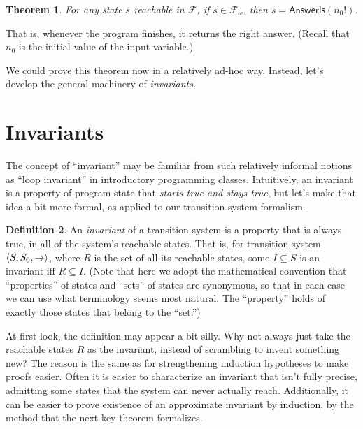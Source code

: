\documentclass{amsbook}
\newtheorem{theorem}{Theorem}[chapter]
\theoremstyle{definition}
\newtheorem{definition}[theorem]{Definition}
\theoremstyle{remark}
\numberwithin{section}{chapter}
\numberwithin{equation}{chapter}
\begin{document}
\begin{theorem}\label{factorial_ok}
  For any state $s$ reachable in $\mathcal F$, if $s \in \mathcal F_\omega$, then $s = \mathsf{AnswerIs}(n_0!)$.
\end{theorem}

That is, whenever the program finishes, it returns the right answer.
(Recall that $n_0$ is the initial value of the input variable.)

We could prove this theorem now in a relatively ad-hoc way.
Instead, let's develop the general machinery of \emph{invariants}.


\section{Invariants}

The concept of ``invariant'' may be familiar from such relatively informal notions as ``loop invariant'' in introductory programming classes.
Intuitively, an invariant is a property of program state that \emph{starts true and stays true}, but let's make that idea a bit more formal, as applied to our transition-system formalism.

\newcommand{\invariants}[0]{}

\invariants
\begin{definition}
  An \emph{invariant} of a transition system is a property that is always true, in all of the system's reachable states.  That is, for transition system ${\left \langle S, S_0, \to \right \rangle}$, where $R$ is the set of all its reachable states, some $I \subseteq S$ is an invariant iff $R \subseteq I$.  (Note that here we adopt the mathematical convention that ``properties'' of states and ``sets'' of states are synonymous, so that in each case we can use what terminology seems most natural.  The ``property'' holds of exactly those states that belong to the ``set.'')
\end{definition}

At first look, the definition may appear a bit silly.
Why not always just take the reachable states $R$ as the invariant, instead of scrambling to invent something new?
The reason is the same as for strengthening induction hypotheses to make proofs easier.
Often it is easier to characterize an invariant that isn't fully precise, admitting some states that the system can never actually reach.
Additionally, it can be easier to prove existence of an approximate invariant by induction, by the method that the next key theorem formalizes.
\end{document}
